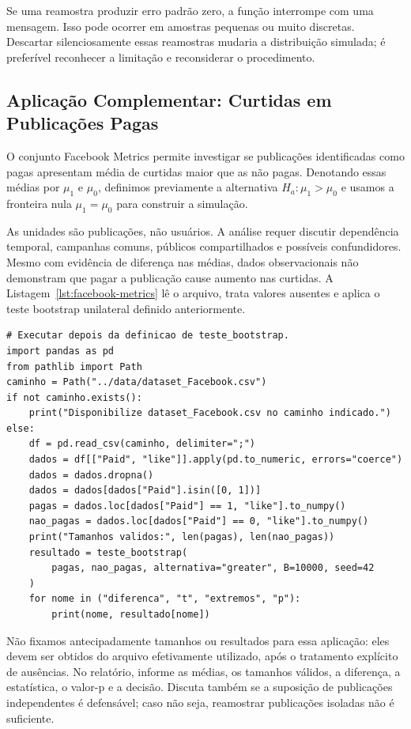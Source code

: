 \documentclass[12pt,a4paper]{article}
\begin{document}
Se uma reamostra produzir erro padrão zero, a função interrompe com uma mensagem. Isso pode ocorrer em amostras pequenas ou muito discretas. Descartar silenciosamente essas reamostras mudaria a distribuição simulada; é preferível reconhecer a limitação e reconsiderar o procedimento.

\subsection{Aplicação Complementar: Curtidas em Publicações Pagas}
O conjunto Facebook Metrics permite investigar se publicações identificadas como pagas apresentam média de curtidas maior que as não pagas. Denotando essas médias por $\mu_1$ e $\mu_0$, definimos previamente a alternativa $H_a:\mu_1>\mu_0$ e usamos a fronteira nula $\mu_1=\mu_0$ para construir a simulação.

As unidades são publicações, não usuários. A análise requer discutir dependência temporal, campanhas comuns, públicos compartilhados e possíveis confundidores. Mesmo com evidência de diferença nas médias, dados observacionais não demonstram que pagar a publicação cause aumento nas curtidas. A Listagem~\ref{lst:facebook-metrics} lê o arquivo, trata valores ausentes e aplica o teste bootstrap unilateral definido anteriormente.

\begin{lstlisting}[caption={Aplicacao ao Facebook Metrics, quando o CSV estiver disponivel.},label={lst:facebook-metrics}]
# Executar depois da definicao de teste_bootstrap.
import pandas as pd
from pathlib import Path
caminho = Path("../data/dataset_Facebook.csv")
if not caminho.exists():
    print("Disponibilize dataset_Facebook.csv no caminho indicado.")
else:
    df = pd.read_csv(caminho, delimiter=";")
    dados = df[["Paid", "like"]].apply(pd.to_numeric, errors="coerce")
    dados = dados.dropna()
    dados = dados[dados["Paid"].isin([0, 1])]
    pagas = dados.loc[dados["Paid"] == 1, "like"].to_numpy()
    nao_pagas = dados.loc[dados["Paid"] == 0, "like"].to_numpy()
    print("Tamanhos validos:", len(pagas), len(nao_pagas))
    resultado = teste_bootstrap(
        pagas, nao_pagas, alternativa="greater", B=10000, seed=42
    )
    for nome in ("diferenca", "t", "extremos", "p"):
        print(nome, resultado[nome])
\end{lstlisting}
Não fixamos antecipadamente tamanhos ou resultados para essa aplicação: eles devem ser obtidos do arquivo efetivamente utilizado, após o tratamento explícito de ausências. No relatório, informe as médias, os tamanhos válidos, a diferença, a estatística, o valor-p e a decisão. Discuta também se a suposição de publicações independentes é defensável; caso não seja, reamostrar publicações isoladas não é suficiente.
\end{document}
